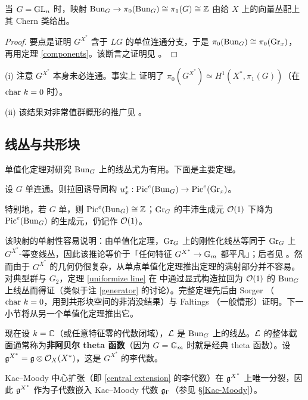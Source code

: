 \begin{ex}
当 $G={\operatorname{GL}}_n$ 时，映射 ${\operatorname{Bun}}_G\to \pi_0({\operatorname{Bun}}_G)\cong\pi_1(G)\cong {\mathbb Z}$ 由给 $X$ 上的向量丛配上其 Chern 类给出。
\end{ex}

\begin{proof}
要点是证明 $G^{X^*}$ 含于 $LG$ 的单位连通分支，于是 $\pi_0({\operatorname{Bun}}_G)\cong \pi_0({\operatorname{Gr}}_{x})$，再用定理 \ref{components}。该断言之证明见 \cite[(1.2)]{BLS}。
\end{proof}

\begin{rmk}
(i) 注意 $G^{X^*}$ 本身未必连通。事实上 \cite{BLS} 证明了 $\pi_0(G^{X^*})\simeq H^1(X^*,\pi_1(G))$（在 ${\operatorname{char}}\ k=0$ 时）。

(ii) 该结果对非常值群概形的推广见 \cite{He}。
\end{rmk}

\subsection{线丛与共形块}

单值化定理对研究 ${\operatorname{Bun}}_G$ 上的线丛尤为有用。下面是主要定理。

\begin{thm}\label{uniformize line}
设 $G$ 单连通。则拉回诱导同构 $u_x^*:{\operatorname{Pic}}^e({\operatorname{Bun}}_G)\to {\operatorname{Pic}}^e({\operatorname{Gr}}_x)$。
\end{thm}

特别地，若 $G$ 单，则 ${\operatorname{Pic}}^e({\operatorname{Bun}}_G)\cong{\mathbb Z}$；${\operatorname{Gr}}_G$ 的丰沛生成元 ${\mathcal O}(1)$ 下降为 ${\operatorname{Pic}}^e({\operatorname{Bun}}_G)$ 的生成元，仍记作 ${\mathcal O}(1)$。

该映射的单射性容易说明：由单值化定理，${\operatorname{Gr}}_G$ 上的刚性化线丛等同于 ${\operatorname{Gr}}_G$ 上 $G^{X^*}$-等变线丛，因此该推论等价于「任何特征 $G^{X^*}\to {\mathbb G}_m$ 都平凡」；后者见 \cite[Corollary 5.2]{LS}。然而由于 $G^{X^*}$ 的几何仍很复杂，从单点单值化定理推出定理的满射部分并不容易。对典型群与 $G_2$，定理 \ref{uniformize line} 在 \cite{LS} 中通过显式构造拉回为 ${\mathcal O}(1)$ 的 ${\operatorname{Bun}}_G$ 上线丛而得证（类似于注 \ref{generator} 的讨论）。完整定理先后由 Sorger \cite{So0}（${\operatorname{char}}\ k=0$，用到共形块空间的非消没结果）与 Faltings \cite[Theorem 17]{Fa}（一般情形）证明。下一小节将从另一个单值化定理推出它。

现在设 $k={\mathbb C}$（或任意特征零的代数闭域），${\mathcal L}$ 是 ${\operatorname{Bun}}_G$ 上的线丛。${\mathcal L}$ 的整体截面通常称为\textbf{非阿贝尔 theta 函数}（因为 $G={\mathbb G}_m$ 时就是经典 theta 函数）。设 ${\mathfrak g}^{X^*}={\mathfrak g}\otimes{\mathcal O}_X(X^*)$，这是 $G^{X^*}$ 的李代数。

\begin{lem}
Kac--Moody 中心扩张（即 \eqref{central extension} 的李代数）在 ${\mathfrak g}^{X^*}$ 上唯一分裂，因此 ${\mathfrak g}^{X^*}$ 作为子代数嵌入 Kac--Moody 代数 ${\mathfrak g}_{\Gamma}$（参见 \S\ref{Kac-Moody}）。
\end{lem}

